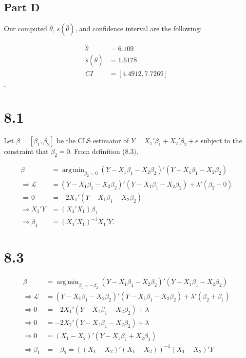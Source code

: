 \documentclass[11pt]{article} %
\DeclareMathOperator*{\argmin}{arg\,min}
\begin{document}
\subsection{Part D}
 Our computed $\hat{\theta}$, $s(\hat{\theta})$, and confidence interval are the following:

\begin{align*}
\hat{\theta} &= 6.109 \\
s(\hat{\theta}) &= 1.6178 \\
CI &= [4.4912,7.7269]
\end{align*}.

\section{8.1}
Let $\beta = [\beta_1,\beta_2]$ be the CLS estimator of $Y = X_1'\beta_1 + X_2' \beta_2 +e$ subject to the constraint that $\beta_2 = 0.$ From definition (8.3),

\begin{align*}
\beta &= \argmin_{\beta_2 = 0}  (Y-X_1\beta_1 -X_2\beta_2)'(Y-X_1\beta_1 -X_2\beta_2)\\
\Rightarrow \mathcal{L} &= (Y-X_1\beta_1 -X_2\beta_2)'(Y-X_1\beta_1 -X_2\beta_2) + \lambda'(\beta_2 - 0)\\
\Rightarrow 0&= -2X_1'(Y-X_1\beta_1 - X_2 \beta_2)\\
\Rightarrow X_1'Y &= (X_1'X_1)\beta_1 \\
\Rightarrow \beta_1 &= (X_1'X_1)^{-1}X_1'Y.
\end{align*}

\section{8.3}
\begin{align*}
\beta &= \argmin_{\beta_1 = -\beta_2}  (Y-X_1\beta_1 -X_2\beta_2)'(Y-X_1\beta_1 -X_2\beta_2)\\
\Rightarrow \mathcal{L} &= (Y-X_1\beta_1 -X_2\beta_2)'(Y-X_1\beta_1 -X_2\beta_2) + \lambda'(\beta_2 + \beta_1)\\
\Rightarrow 0&= -2X_1'(Y-X_1\beta_1 - X_2 \beta_2)+\lambda\\
\Rightarrow 0&= -2X_2'(Y-X_1\beta_1 - X_2 \beta_2)+\lambda\\
\Rightarrow 0&= (X_1 - X_2)'(Y-X_1\beta_1 + X_2 \beta_1)\\
\Rightarrow \beta_1 &= -\beta_2 =( (X_1 - X_2)'(X_1 - X_2))^{-1}(X_1 - X_2)'Y
\end{align*}
\end{document}
